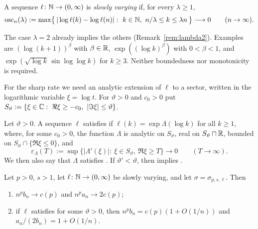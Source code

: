 \begin{definition}\label{def:sv}
A sequence $\ell\colon\mathbb{N}\to(0,\infty)$ is \emph{slowly varying} if, for every $\lambda\ge1$,
\begin{equation}\label{eq:osc}
  \osc_n(\lambda):=\max\bigl\{\,|\log\ell(k)-\log\ell(n)|:\ k\in\N,\ n/\lambda\le k\le\lambda n\,\bigr\}
  \longrightarrow0\qquad(n\to\infty).
\end{equation}
\end{definition}

The case $\lambda=2$ already implies the others (Remark~\ref{rem:lambda2}). Examples are $(\log(k+1))^\beta$ with
$\beta\in\mathbb{R}$, $\exp((\log k)^\beta)$ with $0<\beta<1$, and $\exp(\sqrt{\log k}\,\sin\log\log k)$ for $k\ge3$. Neither
boundedness nor monotonicity is required.

For the sharp rate we need an analytic extension of $\ell$ to a sector, written in the logarithmic variable
$\xi=\log t$. For $\vartheta>0$ and $c_0>0$ put $S_\vartheta:=\{\xi\in\C:\ \Re\xi\ge-c_0,\ |\Im\xi|\le\vartheta\}$.

\begin{definition}\label{def:A}
Let $\vartheta>0$. A sequence $\ell$ satisfies \Ath{\vartheta} if $\ell(k)=\exp\Lambda(\log k)$ for all $k\ge1$,
where, for some $c_0>0$, the function $\Lambda$ is analytic on $S_\vartheta$, real on $S_\vartheta\cap\mathbb{R}$, bounded on
$S_\vartheta\cap\{\Re\xi\le0\}$, and
\begin{equation}\label{eq:epsLambda}
  \varepsilon_\Lambda(T):=\sup\bigl\{|\Lambda'(\xi)|:\ \xi\in S_\vartheta,\ \Re\xi\ge T\bigr\}\longrightarrow0
  \qquad(T\to\infty).
\end{equation}
We then also say that $\Lambda$ satisfies \Ath{\vartheta}. If $\vartheta'<\vartheta$, then \Ath{\vartheta} implies
.
\end{definition}

\begin{maintheorem}\label{thm:main}
Let $p>0$, $s>1$, let $\ell\colon\mathbb{N}\to(0,\infty)$ be slowly varying, and let $\sigma=\sigma_{p,s,\ell}$. Then
\begin{enumerate}
\item[\textup{(i)}] $n^pb_n\to c(p)$ and $n^pa_n\to2c(p)$;
\item[\textup{(ii)}] if $\ell$ satisfies \Ath{\vartheta} for some $\vartheta>0$, then $n^pb_n=c(p)(1+O(1/n))$ and
  $a_n/(2b_n)=1+O(1/n)$.
\end{enumerate}
\end{maintheorem}

